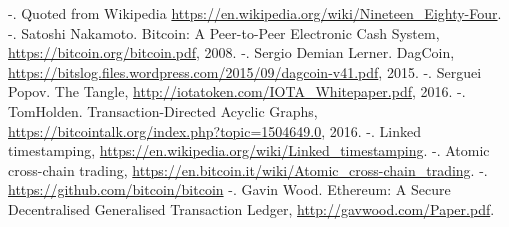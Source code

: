 \documentclass[a4paper, dvipdfmx]{jsarticle}
\begin{document}
\begin{flushleft}
\begin{thebibliography}{1}
\makeatletter
\def\@biblabel#1{}
\let\old@bibitem\bibitem
\def\bibitem#1{\old@bibitem{#1}\leavevmode\kern-\bibindent}
\makeatother

1. Quoted from Wikipedia \url{https://en.wikipedia.org/wiki/Nineteen_Eighty-Four}.
2. Satoshi Nakamoto. Bitcoin: A Peer-to-Peer Electronic Cash System, \url{https://bitcoin.org/bitcoin.pdf}, 2008.
3. Sergio Demian Lerner. DagCoin, \url{https://bitslog.files.wordpress.com/2015/09/dagcoin-v41.pdf}, 2015.
4. Serguei Popov. The Tangle, \url{http://iotatoken.com/IOTA_Whitepaper.pdf}, 2016.
5. TomHolden. Transaction-Directed Acyclic Graphs, \url{https://bitcointalk.org/index.php?topic=1504649.0}, 2016.
6. Linked timestamping, \url{https://en.wikipedia.org/wiki/Linked_timestamping}.
7. Atomic cross-chain trading, \url{https://en.bitcoin.it/wiki/Atomic_cross-chain_trading}.
8. \url{https://github.com/bitcoin/bitcoin}
9. Gavin Wood. Ethereum: A Secure Decentralised Generalised Transaction Ledger, \url{http://gavwood.com/Paper.pdf}.

\end{thebibliography}
\end{flushleft}
\end{document}
